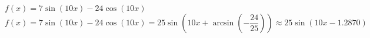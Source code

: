  {$f(x) = 7\sin(10x) - 24\cos(10x)$}
{ $f(x) = 7\sin(10x) - 24\cos(10x) = 25\sin\left( 10x + \arcsin\left(-\dfrac{24}{25}\right)\right) \approx 25 \sin(10x-1.2870)$}
